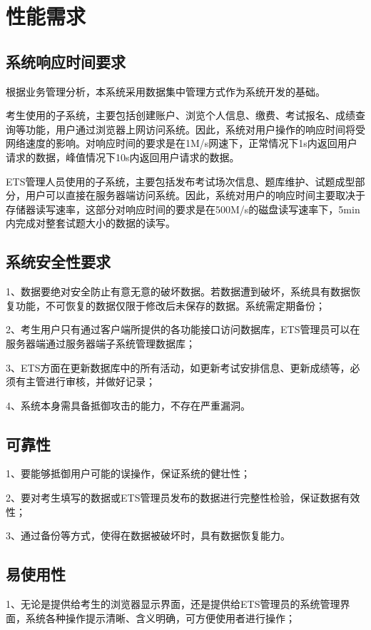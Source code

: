 \section{性能需求}

\subsection{系统响应时间要求}
根据业务管理分析，本系统采用数据集中管理方式作为系统开发的基础。

考生使用的子系统，主要包括创建账户、浏览个人信息、缴费、考试报名、成绩查询等功能，用户通过浏览器上网访问系统。因此，系统对用户操作的响应时间将受网络速度的影响。对响应时间的要求是在1M/s网速下，正常情况下1s内返回用户请求的数据，峰值情况下10s内返回用户请求的数据。

ETS管理人员使用的子系统，主要包括发布考试场次信息、题库维护、试题成型部分，用户可以直接在服务器端访问系统。因此，系统对用户的响应时间主要取决于存储器读写速率，这部分对响应时间的要求是在500M/s的磁盘读写速率下，5min内完成对整套试题大小的数据的读写。

\subsection{系统安全性要求}
1、数据要绝对安全防止有意无意的破坏数据。若数据遭到破坏，系统具有数据恢复功能，不可恢复的数据仅限于修改后未保存的数据。系统需定期备份；

2、考生用户只有通过客户端所提供的各功能接口访问数据库，ETS管理员可以在服务器端通过服务器端子系统管理数据库；

3、ETS方面在更新数据库中的所有活动，如更新考试安排信息、更新成绩等，必须有主管进行审核，并做好记录；

4、系统本身需具备抵御攻击的能力，不存在严重漏洞。

\subsection{可靠性}
1、要能够抵御用户可能的误操作，保证系统的健壮性；

2、要对考生填写的数据或ETS管理员发布的数据进行完整性检验，保证数据有效性；

3、通过备份等方式，使得在数据被破坏时，具有数据恢复能力。

\subsection{易使用性}
1、无论是提供给考生的浏览器显示界面，还是提供给ETS管理员的系统管理界面，系统各种操作提示清晰、含义明确，可方便使用者进行操作；

